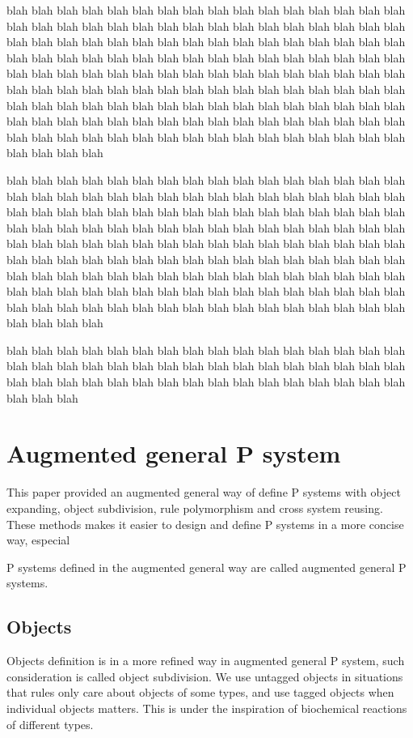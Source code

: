 \documentclass[9pt,a4paper,twoside]{article}
\begin{document}
         blah blah blah blah blah blah blah blah blah blah blah blah blah blah blah blah blah blah blah blah blah blah blah blah blah blah blah blah blah blah blah blah blah blah blah blah blah blah blah blah blah blah blah blah blah blah blah blah blah blah blah blah blah blah blah blah blah blah blah blah blah blah blah blah blah blah blah blah blah blah blah blah blah blah blah blah blah blah blah blah blah blah blah blah blah blah blah blah blah blah blah blah blah blah blah blah blah blah blah blah blah blah blah blah blah blah blah blah blah blah blah blah blah blah blah blah blah blah blah blah blah blah blah blah blah blah blah blah blah blah blah blah blah blah blah blah blah blah blah blah blah blah blah blah blah blah blah blah 
         
          blah blah blah blah blah blah blah blah blah blah blah blah blah blah blah blah blah blah blah blah blah blah blah blah blah blah blah blah blah blah blah blah blah blah blah blah blah blah blah blah blah blah blah blah blah blah blah blah blah blah blah blah blah blah blah blah blah blah blah blah blah blah blah blah blah blah blah blah blah blah blah blah blah blah blah blah blah blah blah blah blah blah blah blah blah blah blah blah blah blah blah blah blah blah blah blah blah blah blah blah blah blah blah blah blah blah blah blah blah blah blah blah blah blah blah blah blah blah blah blah blah blah blah blah blah blah blah blah blah blah blah blah blah blah blah blah blah blah blah blah blah blah blah blah blah blah blah blah 

           blah blah blah blah blah blah blah blah blah blah blah blah blah blah blah blah blah blah blah blah blah blah blah blah blah blah blah blah blah blah blah blah blah blah blah blah blah blah blah blah blah blah blah blah blah blah blah blah blah blah blah 
        
    \section{Augmented general P system}
        This paper provided an augmented general way of define P systems with object expanding, object subdivision, rule polymorphism and cross system 
        reusing. These methods makes it easier to design and define P systems in a more concise way, especial 

        P systems defined in the augmented general way are called augmented general P systems.
        \subsection{Objects}
            Objects definition is in a more refined way in augmented general P system, such consideration is called object subdivision. We use untagged objects in
            situations that rules only care about objects of some types, and use tagged objects when individual objects matters. This is under the inspiration of 
            biochemical reactions of different types.
\end{document}
